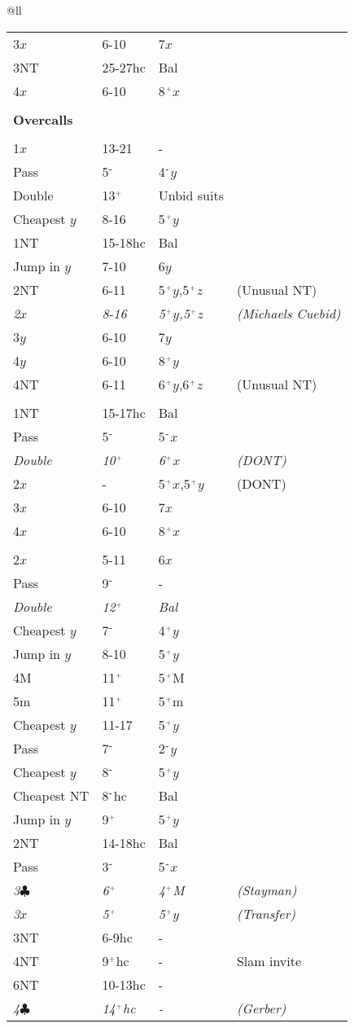 \documentclass[10pt]{article}
\newcommand{\clubs}{{\color{BlackSuit}\ensuremath{\clubsuit}}}
\newcommand{\notrump}{NT}
\newcommand{\minor}{m}
\newcommand{\major}{M}
\newcommand{\hcp}{hc}
\newcommand{\balanced}{Bal}
\newcommand{\pass}{Pass}
\newcommand{\double}{Double}
\newcommand{\cheapest}{Cheapest }
\newcommand{\jump}{Jump in }
\newcommand{\bid}[4]{ #1 & #2 & #3 & #4 \\}
\newcommand{\forcebid}[4]{\bid{\textit{#1}}{\textit{#2}}{\textit{#3}}{\textit{#4}}}
\newcommand{\slambid}[4]{\bid{#1}{#2}{#3}{#4 Slam invite}}
\newcommand{\opponent}[4]{\bid{\color{OpponentBid}#1}{\color{OpponentBid}#2}{\color{OpponentBid}#3}{\color{OpponentBid}#4}}
\newcommand{\bidblock}[1]{\\ [-1.75ex] #1 \hline}
\newcommand{\response}{\hspace{1.0em}}
\newcommand{\overcall}{\hspace{0.65em}}
\newcommand{\ormore}{\ensuremath{^{\mbox{\tiny{+}}}}}
\newcommand{\orless}{\ensuremath{^{\mbox{\small{-}}}}}
\begin{document}
\begin{table}[htbp]
\begin{tabular*}{\textwidth}{@{\extracolsep{-1cm}}ll}
{{\begin{minipage}{0.5\textwidth}
\begin{tabular}{llll}
\\ [-1.75ex] \bid{3$x$}{6-10}{7$x$}{}

\bid{3\notrump}{25-27\hcp}{\balanced}{}

\bid{4$x$}{6-10}{8\ormore$x$}{}

\\

{\large\textbf{Overcalls}} \\

\bidblock{\opponent{1$x$}{13-21}{-}{}}
\overcall\bid{\pass}{5\orless}{4\orless$y$}{}
\overcall\bid{\double}{13\ormore}{Unbid suits}{}
\overcall\bid{\cheapest$y$}{8-16}{5\ormore$y$}{}
\overcall\bid{1\notrump}{15-18\hcp}{\balanced}{}
\overcall\bid{\jump$y$}{7-10}{6$y$}{}
\overcall\bid{2\notrump}{6-11}{5\ormore$y$,5\ormore$z$}{(Unusual NT)}
\overcall\forcebid{2$x$}{8-16}{5\ormore$y$,5\ormore$z$}{(Michaels Cuebid)}
\overcall\bid{3$y$}{6-10}{7$y$}{}
\overcall\bid{4$y$}{6-10}{8\ormore$y$}{}
\overcall\bid{4\notrump}{6-11}{6\ormore$y$,6\ormore$z$}{(Unusual NT)}

\bidblock{\opponent{1\notrump}{15-17\hcp}{\balanced}{}}
\overcall\bid{\pass}{5\orless}{5\orless$x$}{}
\overcall\forcebid{\double}{10\ormore}{6\ormore$x$}{(DONT)}
\overcall\bid{2$x$}{-}{5\ormore$x$,5\ormore$y$}{(DONT)}
\overcall\bid{3$x$}{6-10}{7$x$}{}
\overcall\bid{4$x$}{6-10}{8\ormore$x$}{}

\bidblock{\opponent{2$x$}{5-11}{6$x$}{}}
\overcall\bid{\pass}{9\orless}{-}{}

\overcall\forcebid{\double}{12\ormore}{\balanced}{}
\overcall\response\bid{\cheapest$y$}{7\orless}{4\ormore$y$}{}
\overcall\response\bid{\jump$y$}{8-10}{5\ormore$y$}{}
\overcall\response\bid{4\major}{11\ormore}{5\ormore\major}{}
\overcall\response\bid{5\minor}{11\ormore}{5\ormore\minor}{}

\overcall\bid{\cheapest$y$}{11-17}{5\ormore$y$}{}
\overcall\response\bid{\pass}{7\orless}{2\orless$y$}{} %
\overcall\response\bid{\cheapest$y$}{8\orless}{5\ormore$y$}{}%
\overcall\response\bid{\cheapest\notrump}{8\orless\hcp}{\balanced}{} %
\overcall\response\bid{\jump$y$}{9\ormore}{5\ormore$y$}{} %

\overcall\bid{2\notrump}{14-18\hcp}{\balanced}{}
\overcall\response\bid{\pass}{3\orless}{5\orless$x$}{}
\overcall\response\forcebid{3\clubs}{6\ormore}{4\ormore\major}{(Stayman)}
\overcall\response\forcebid{3$x$}{5\ormore}{5\ormore$y$}{(Transfer)}
\overcall\response\bid{3\notrump}{6-9\hcp}{-}{}
\overcall\response\slambid{4\notrump}{9\ormore\hcp}{-}{}
\overcall\response\bid{6\notrump}{10-13\hcp}{-}{}
\overcall\response\forcebid{4\clubs}{14\ormore\hcp}{-}{(Gerber)}


\end{tabular}
\end{minipage}}}
\end{tabular*}
\end{table}
\end{document}
